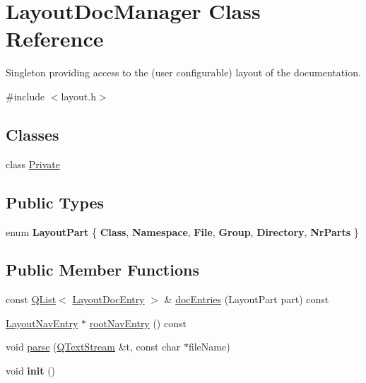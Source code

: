 \hypertarget{class_layout_doc_manager}{}\section{Layout\+Doc\+Manager Class Reference}
\label{class_layout_doc_manager}


Singleton providing access to the (user configurable) layout of the documentation.  




{\ttfamily \#include $<$layout.\+h$>$}

\subsection*{Classes}
\begin{DoxyCompactItemize}
\item 
class \mbox{\hyperlink{class_layout_doc_manager_1_1_private}{Private}}
\end{DoxyCompactItemize}
\subsection*{Public Types}
\begin{DoxyCompactItemize}
\item 
\mbox{\label{class_layout_doc_manager_aee13a925ea1f915c542ecd7f579ebc94}} 
enum {\bfseries Layout\+Part} \{ \newline
{\bfseries Class}, 
{\bfseries Namespace}, 
{\bfseries File}, 
{\bfseries Group}, 
\newline
{\bfseries Directory}, 
{\bfseries Nr\+Parts}
 \}
\end{DoxyCompactItemize}
\subsection*{Public Member Functions}
\begin{DoxyCompactItemize}
\item 
const \mbox{\hyperlink{class_q_list}{Q\+List}}$<$ \mbox{\hyperlink{struct_layout_doc_entry}{Layout\+Doc\+Entry}} $>$ \& \mbox{\hyperlink{class_layout_doc_manager_aef7fca7915e8c72f55fd32e70988d191}{doc\+Entries}} (Layout\+Part part) const
\item 
\mbox{\hyperlink{struct_layout_nav_entry}{Layout\+Nav\+Entry}} $\ast$ \mbox{\hyperlink{class_layout_doc_manager_ad70cfcbfc25b8f303a59cd8f76c61465}{root\+Nav\+Entry}} () const
\item 
void \mbox{\hyperlink{class_layout_doc_manager_ade92fd2ccfa31a7bd8b152848d224053}{parse}} (\mbox{\hyperlink{class_q_text_stream}{Q\+Text\+Stream}} \&t, const char $\ast$file\+Name)
\item 
\mbox{\label{class_layout_doc_manager_a920748477d4262faf758d21ddbe2329d}} 
void {\bfseries init} ()
\end{DoxyCompactItemize}
